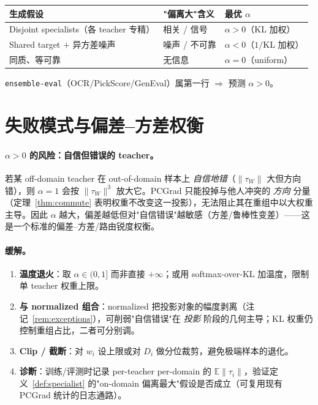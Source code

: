 \documentclass[11pt,a4paper]{article}
\newcommand{\E}{\mathbb{E}}
\newcommand{\norm}[1]{\lVert #1\rVert}
\theoremstyle{plain}
\theoremstyle{definition}
\begin{document}
\begin{tcolorbox}[colback=gray!6,colframe=gray!50,title=\textbf{判别准则：$\alpha$ 的符号编码先验}]
\begin{center}
\begin{tabular}{lll}
\toprule
\textbf{生成假设} & \textbf{"偏离大"含义} & \textbf{最优 $\alpha$} \\
\midrule
Disjoint specialists（各 teacher 专精） & 相关 / 信号 & $\alpha>0$（KL 加权） \\
Shared target $+$ 异方差噪声 & 噪声 / 不可靠 & $\alpha<0$（$1/$KL 加权） \\
同质、等可靠 & 无信息 & $\alpha=0$（uniform） \\
\bottomrule
\end{tabular}
\end{center}
\texttt{ensemble-eval}（OCR/PickScore/GenEval）属第一行 $\Rightarrow$ 预测 $\alpha>0$。
\end{tcolorbox}

\section{失败模式与偏差--方差权衡}

\paragraph{$\alpha>0$ 的风险：自信但错误的 teacher。} 若某 off-domain teacher 在 out-of-domain 样本上 \emph{自信地错}（$\norm{\tau_W}$ 大但方向错），则 $\alpha=1$ 会按 $\norm{\tau_W}^3$ 放大它。PCGrad 只能投掉与他人冲突的 \emph{方向} 分量（定理~\ref{thm:commute} 表明权重不改变这一投影），无法阻止其在重组中以大权重主导。因此 $\alpha$ 越大，偏差越低但对"自信错误"越敏感（方差/鲁棒性变差）——这是一个标准的偏差--方差/路由锐度权衡。

\paragraph{缓解。}
\begin{enumerate}[leftmargin=1.6em]
\item \textbf{温度退火}：取 $\alpha\in(0,1]$ 而非直接 $+\infty$；或用 softmax-over-KL 加温度，限制单 teacher 权重上限。
\item \textbf{与 normalized 组合}：normalized 把投影对象的幅度剥离（注记~\ref{rem:exceptions}），可削弱"自信错误"在 \emph{投影} 阶段的几何主导；KL 权重仍控制重组占比，二者可分别调。
\item \textbf{Clip / 截断}：对 $w_i$ 设上限或对 $D_i$ 做分位裁剪，避免极端样本的退化。
\item \textbf{诊断}：训练/评测时记录 per-teacher per-domain 的 $\E\norm{\tau_i}$，验证定义~\ref{def:specialist} 的"on-domain 偏离最大"假设是否成立（可复用现有 PCGrad 统计的日志通路）。
\end{enumerate}
\end{document}
